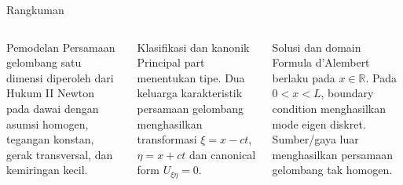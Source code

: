 \documentclass[aspectratio=169,10pt]{beamer}
\begin{document}
\begin{frame}{Rangkuman}
\small
\begin{columns}[T,onlytextwidth]
\begin{block}{Pemodelan}
Persamaan gelombang satu dimensi diperoleh dari Hukum II Newton pada dawai dengan asumsi homogen, tegangan konstan, gerak transversal, dan kemiringan kecil.
\end{block}
\begin{block}{Klasifikasi dan kanonik}
Principal part menentukan tipe. Dua keluarga karakteristik persamaan gelombang menghasilkan transformasi $\xi=x-ct$, $\eta=x+ct$ dan canonical form $U_{\xi\eta}=0$.
\end{block}
\begin{block}{Solusi dan domain}
Formula d'Alembert berlaku pada $x\in\mathbb R$. Pada $0<x<L$, boundary condition menghasilkan mode eigen diskret. Sumber/gaya luar menghasilkan persamaan gelombang tak homogen.
\end{block}
\end{columns}
\vspace{0.15cm}
\centering
{}
\end{frame}
\end{document}
